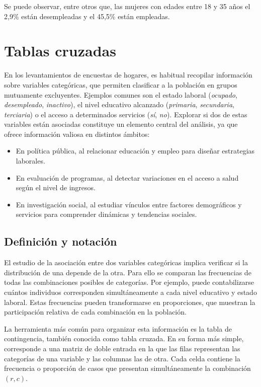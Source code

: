 \documentclass[
  spanish,
  12pt,
]{book}
\providecommand{\tightlist}{%
  \setlength{\itemsep}{0pt}\setlength{\parskip}{0pt}}
\begin{document}
Se puede observar, entre otros que, las mujeres con edades entre 18 y 35 años el 2,9\% están desempleadas y el 45,5\% están empleadas.

\section{Tablas cruzadas}\label{tablas-cruzadas}

En los levantamientos de encuestas de hogares, es habitual recopilar información sobre variables categóricas, que permiten clasificar a la población en grupos mutuamente excluyentes. Ejemplos comunes son el estado laboral (\emph{ocupado}, \emph{desempleado}, \emph{inactivo}), el nivel educativo alcanzado (\emph{primaria}, \emph{secundaria}, \emph{terciaria}) o el acceso a determinados servicios (\emph{sí}, \emph{no}). Explorar si dos de estas variables están asociadas constituye un elemento central del análisis, ya que ofrece información valiosa en distintos ámbitos:

\begin{itemize}
\tightlist
\item
  En política pública, al relacionar educación y empleo para diseñar estrategias laborales.
\item
  En evaluación de programas, al detectar variaciones en el acceso a salud según el nivel de ingresos.
\item
  En investigación social, al estudiar vínculos entre factores demográficos y servicios para comprender dinámicas y tendencias sociales.
\end{itemize}

\subsection{Definición y notación}\label{definiciuxf3n-y-notaciuxf3n}

El estudio de la asociación entre dos variables categóricas implica verificar si la distribución de una depende de la otra. Para ello se comparan las frecuencias de todas las combinaciones posibles de categorías. Por ejemplo, puede contabilizarse cuántos individuos corresponden simultáneamente a cada nivel educativo y estado laboral. Estas frecuencias pueden transformarse en proporciones, que muestran la participación relativa de cada combinación en la población.

La herramienta más común para organizar esta información es la tabla de contingencia, también conocida como tabla cruzada. En su forma más simple, corresponde a una matriz de doble entrada en la que las filas representan las categorías de una variable y las columnas las de otra. Cada celda contiene la frecuencia o proporción de casos que presentan simultáneamente la combinación \((r,c)\).
\end{document}

